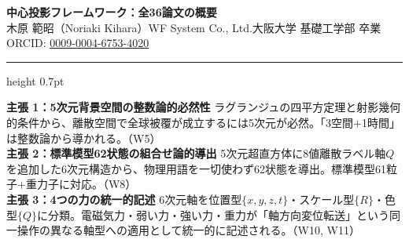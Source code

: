 \documentclass[9pt,a4paper]{ltjsarticle}
\begin{document}
\begin{center}
{\Large\bfseries 中心投影フレームワーク：全36論文の概要}\\[2pt]
{\small 木原 範昭（Noriaki Kihara）\enspace WF System Co., Ltd.\enspace 大阪大学 基礎工学部 卒業\enspace ORCID: \href{https://orcid.org/0009-0004-6753-4020}{0009-0004-6753-4020}}
\end{center}

\vspace{-1pt}
\hrule height 0.7pt
\vspace{4pt}

\begin{tcolorbox}[colback=gray!7,colframe=gray!55,boxrule=0.4pt,arc=2pt,left=4pt,right=4pt,top=2pt,bottom=2pt]
{\small
\textbf{主張 1：5次元背景空間の整数論的必然性}\enspace
ラグランジュの四平方定理と射影幾何的条件から、離散空間で全球被覆が成立するには5次元が必然。「3空間$+$1時間」は整数論から導かれる。{\scriptsize（W5）}\\[2pt]
\textbf{主張 2：標準模型62状態の組合せ論的導出}\enspace
5次元超直方体に8値離散ラベル軸$Q$を追加した6次元構造から、物理用語を一切使わず62状態を導出。標準模型61粒子$+$重力子に対応。{\scriptsize（W8）}\\[2pt]
\textbf{主張 3：4つの力の統一的記述}\enspace
6次元軸を位置型$\{x,y,z,t\}$・スケール型$\{R\}$・色型$\{Q\}$に分類。電磁気力・弱い力・強い力・重力が「軸方向変位転送」という同一操作の異なる軸型への適用として統一的に記述される。{\scriptsize（W10, W11）}}
\end{tcolorbox}

\vspace{2pt}
\end{document}
